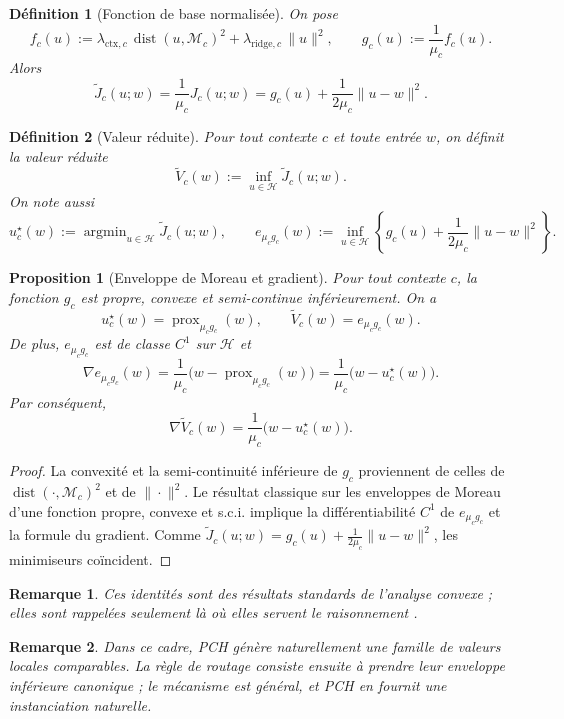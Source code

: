 \documentclass[11pt,a4paper]{article}
\newtheorem{definition}{Définition}[section]
\newtheorem{proposition}{Proposition}[section]
\newtheorem{remark}{Remarque}[section]
\DeclareMathOperator{\prox}{prox}
\DeclareMathOperator{\argmin}{argmin}
\DeclareMathOperator{\dist}{dist}
\newcommand{\Hh}{\mathcal H}
\newcommand{\Mcal}{\mathcal M}
\begin{document}
\begin{definition}[Fonction de base normalisée]
On pose
\[
f_c(u):=\lambda_{\mathrm{ctx},c}\,\dist(u,\Mcal_c)^2+\lambda_{\mathrm{ridge},c}\,\|u\|^2,
\qquad
g_c(u):=\frac{1}{\mu_c}f_c(u).
\]
Alors
\[
\widetilde J_c(u;w)=\frac{1}{\mu_c}J_c(u;w)=g_c(u)+\frac{1}{2\mu_c}\|u-w\|^2.
\]
\end{definition}

\begin{definition}[Valeur réduite]
Pour tout contexte \(c\) et toute entrée \(w\), on définit la valeur réduite
\[
\widetilde V_c(w):=\inf_{u\in\Hh}\widetilde J_c(u;w).
\]
On note aussi
\[
u_c^\star(w):=\argmin_{u\in\Hh}\widetilde J_c(u;w),
\qquad
e_{\mu_c g_c}(w):=\inf_{u\in\Hh}\left\{g_c(u)+\frac{1}{2\mu_c}\|u-w\|^2\right\}.
\]
\end{definition}

\begin{proposition}[Enveloppe de Moreau et gradient]
Pour tout contexte \(c\), la fonction \(g_c\) est propre, convexe et semi-continue inférieurement. On a
\[
u_c^\star(w)=\prox_{\mu_c g_c}(w),
\qquad
\widetilde V_c(w)=e_{\mu_c g_c}(w).
\]
De plus, \(e_{\mu_c g_c}\) est de classe \(C^1\) sur \(\Hh\) et
\[
\nabla e_{\mu_c g_c}(w)=\frac{1}{\mu_c}\bigl(w-\prox_{\mu_c g_c}(w)\bigr)
=\frac{1}{\mu_c}\bigl(w-u_c^\star(w)\bigr).
\]
Par conséquent,
\[
\nabla \widetilde V_c(w)=\frac{1}{\mu_c}\bigl(w-u_c^\star(w)\bigr).
\]
\end{proposition}

\begin{proof}
La convexité et la semi-continuité inférieure de \(g_c\) proviennent de celles de \(\dist(\cdot,\Mcal_c)^2\) et de \(\|\cdot\|^2\). Le résultat classique sur les enveloppes de Moreau d'une fonction propre, convexe et s.c.i. implique la différentiabilité \(C^1\) de \(e_{\mu_c g_c}\) et la formule du gradient. Comme \(\widetilde J_c(u;w)=g_c(u)+\frac{1}{2\mu_c}\|u-w\|^2\), les minimiseurs coïncident.
\end{proof}

\begin{remark}
Ces identités sont des résultats standards de l'analyse convexe ; elles sont rappelées seulement là où elles servent le raisonnement \cite{Moreau1965,Rockafellar1970,BauschkeCombettes2017,RockafellarWets1998}.
\end{remark}

\begin{remark}
Dans ce cadre, PCH génère naturellement une famille de valeurs locales comparables. La règle de routage consiste ensuite à prendre leur enveloppe inférieure canonique ; le mécanisme est général, et PCH en fournit une instanciation naturelle.
\end{remark}
\end{document}
